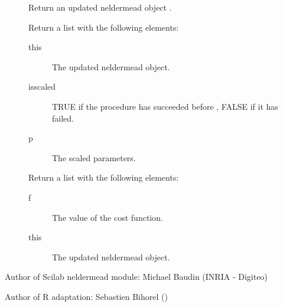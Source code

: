 \begin{Value}
\begin{description}
\item[] Return an updated neldermead object
.
\item[] Return a list with the following elements:
\begin{description}

\item[this] The updated neldermead object.
\item[isscaled] TRUE if the procedure has succeeded before
, FALSE if it has failed.
\item[p] The scaled parameters.

\end{description}


\item[] Return a list with the following elements:
\begin{description}

\item[f] The value of the cost function.
\item[this] The updated neldermead object.

\end{description}



\end{description}

\end{Value}
%
\begin{Author}\relax
Author of Scilab neldermead module: Michael Baudin (INRIA - Digiteo)

Author of R adaptation: Sebastien Bihorel ()
\end{Author}
